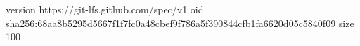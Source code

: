 version https://git-lfs.github.com/spec/v1
oid sha256:68aa8b5295d5667f1f7fc0a48cbef9f786a5f390844cfb1fa6620d05c5840f09
size 100
